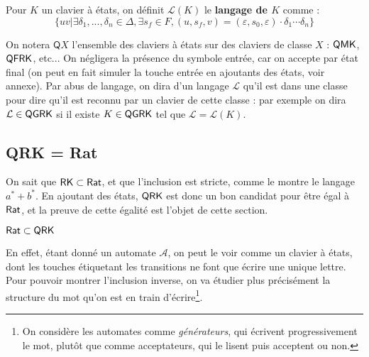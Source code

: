 \documentclass[12pt, a4paper]{article}
\renewcommand{\L}{\mathcal{L}}
\newcommand{\A}{\mathcal{A}}
\begin{document}
    \begin{langageclavierQ}
        Pour $K$ un clavier à états, on définit $\L(K)$ le \textbf{langage de $K$} comme :
        \[ \{uv | \exists\delta_1,...,\delta_n \in \Delta, \exists s_f \in F, (u,s_f,v) = (\varepsilon,s_0,\varepsilon)\cdot\delta_1\cdots\delta_n \}\]
    \end{langageclavierQ}
    On notera $\mathsf{Q}X$ l'ensemble des claviers à états sur des claviers de classe $X$ : $\mathsf{QMK}$, $\mathsf{QFRK}$, etc... 
    On négligera la présence du symbole entrée, car on accepte par état final (on peut en fait simuler la touche entrée en ajoutants des états, voir annexe).
    Par abus de langage, on dira d'un langage $\L$ qu'il est dans une classe pour dire qu'il est reconnu par un clavier de cette classe : 
    par exemple on dira $\L \in \QGRK$ si il existe $K \in \mathsf{QGRK}$ tel que $\L = \L(K)$.


    \subsection{QRK = Rat}
    On sait que \autocite[théorèmes~101/102]{bible} $\mathsf{RK} \subset \mathsf{Rat}$, et que l'inclusion est stricte, comme le montre le langage $a^* + b^*$. En ajoutant des états,
    $\mathsf{QRK}$ est donc un bon candidat pour être égal à $\mathsf{Rat}$, et la preuve de cette égalité est l'objet de cette section.
    
    \begin{RatdansQRK}
        $\mathsf{Rat} \subset \mathsf{QRK}$
    \end{RatdansQRK}
    En effet, étant donné un automate $\A$, on peut le voir comme un clavier à états, dont les touches étiquetant les transitions 
    ne font que écrire une unique lettre. \smallskip \\
    Pour pouvoir montrer l'inclusion inverse, on va étudier plus précisément la structure du mot qu'on est en train d'écrire\footnote{On considère les automates comme \emph{générateurs}, qui écrivent progressivement le mot, plutôt que comme acceptateurs, qui le lisent puis acceptent ou non.}.
    
\end{document}
